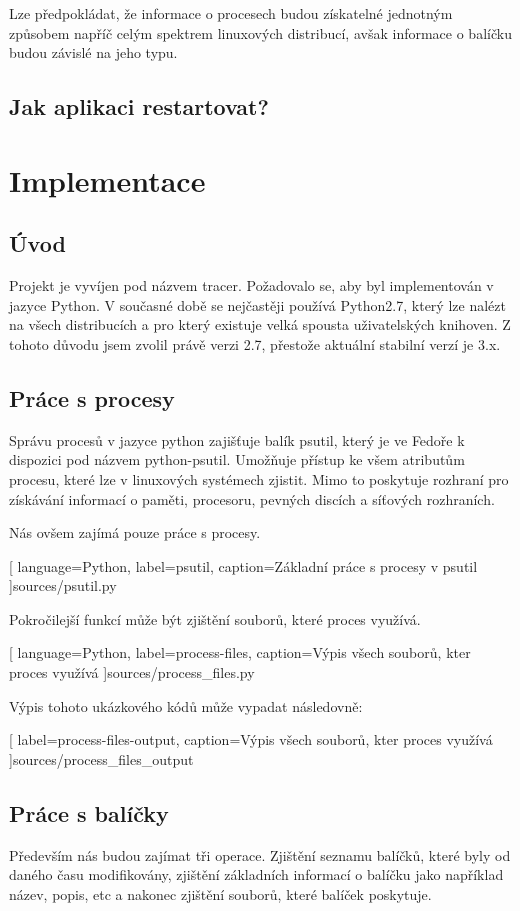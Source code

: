 \documentclass[10pt,a4paper]{article}
\begin{document}
		Lze předpokládat, že informace o procesech budou získatelné jednotným způsobem napříč celým spektrem linuxových distribucí, avšak informace o balíčku budou závislé na jeho typu.

		\subsection{Jak aplikaci restartovat?}

	\pagebreak
	\section{Implementace}
		\subsection{Úvod}
		Projekt je vyvíjen pod názvem tracer. Požadovalo se, aby byl implementován v jazyce Python. V současné době se nejčastěji používá Python2.7, který lze nalézt na všech distribucích a pro který existuje velká spousta uživatelských knihoven. Z tohoto důvodu jsem zvolil právě verzi 2.7, přestože aktuální stabilní verzí je 3.x.

		\subsection{Práce s procesy}
		Správu procesů v jazyce python zajišťuje balík psutil, který je ve Fedoře k dispozici pod názvem python-psutil. Umožňuje přístup ke všem atributům procesu, které lze v linuxových systémech zjistit. Mimo to poskytuje rozhraní pro získávání informací o paměti, procesoru, pevných discích a síťových rozhraních.

		Nás ovšem zajímá pouze práce s procesy.

		
		[
			language={Python},
			label=psutil,
			caption={Základní práce s procesy v psutil}
		]{sources/psutil.py}

		Pokročilejší funkcí může být zjištění souborů, které proces využívá.

		
		[
			language={Python},
			label=process-files,
			caption={Výpis všech souborů, kter proces využívá}
		]{sources/process_files.py}

		Výpis tohoto ukázkového kódů může vypadat následovně:

		
		[
			label=process-files-output,
			caption={Výpis všech souborů, kter proces využívá}
		]{sources/process_files_output}

		\subsection{Práce s balíčky}
			Především nás budou zajímat tři operace. Zjištění seznamu balíčků, které byly od daného času modifikovány, zjištění základních informací o balíčku jako například název, popis, etc a nakonec zjištění souborů, které balíček poskytuje.
\end{document}
